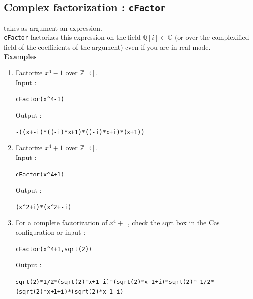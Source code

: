 \documentclass[a4paper,11pt]{book}
\begin{document}
\subsection{Complex factorization : {\tt cFactor}}
 takes as argument an expression.\\
{\tt cFactor} factorizes this expression on the field 
$\mathbb Q[i] \subset \mathbb C$ (or over the complexified field of 
the coefficients of the argument) even if you are in real mode.\\
{\bf Examples}
\begin{enumerate}
\item Factorize $x^4-1$ over $\mathbb Z[i]$.\\
Input :
\begin{center}{\tt cFactor(x\verb|^|4-1)}\end{center}
Output :
\begin{center}{\tt -((x+-i)*((-i)*x+1)*((-i)*x+i)*(x+1))}\end{center}
\item Factorize $x^4+1$ over $\mathbb Z[i]$.\\
Input :
\begin{center}{\tt cFactor(x\verb|^|4+1)}\end{center}
Output :
\begin{center}{\tt (x\verb|^|2+i)*(x\verb|^|2+-i)}\end{center}
\item For a complete factorization of $x^4+1$, 
check the sqrt box in the Cas configuration or input :
\begin{center}{\tt cFactor(x\verb|^|4+1,sqrt(2))}\end{center}
Output :
\begin{center}{\tt sqrt(2)*1/2*(sqrt(2)*x+1-i)*(sqrt(2)*x-1+i)*sqrt(2)* 1/2*(sqrt(2)*x+1+i)*(sqrt(2)*x-1-i)}\end{center}
\end{enumerate}
\end{document}
